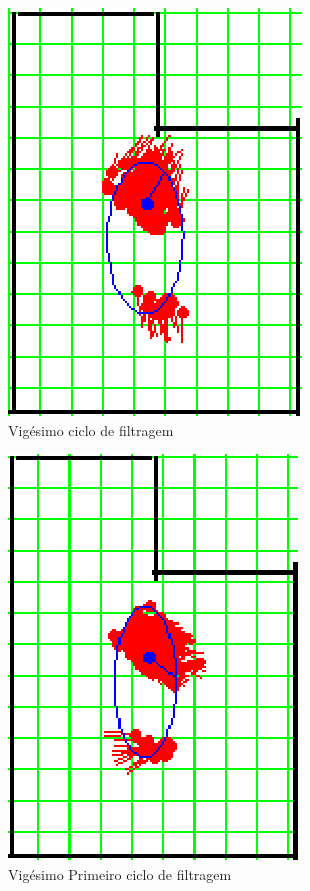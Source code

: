 \begin{figure}[H]
  \centering
  \includegraphics[scale=1]{figuras/cen1_ex3/21.eps}
  \caption[Vigésimo Ciclo de Filtragem]{Vigésimo ciclo de filtragem}
  \label{img:cen1_ex3_21}
\end{figure}

\begin{figure}[H]
  \centering
  \includegraphics[scale=1]{figuras/cen1_ex3/22.eps}
  \caption[Vigésimo Primeiro Ciclo de Filtragem]{Vigésimo Primeiro ciclo de filtragem}
  \label{img:cen1_ex3_22}
\end{figure}

